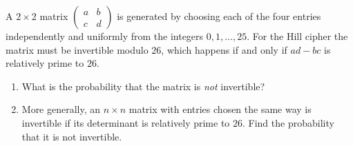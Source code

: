 A $2\times2$ matrix $\begin{pmatrix}a&b\\c&d\end{pmatrix}$ is generated by choosing each of the four entries independently and uniformly from the integers $0,1,\dots,25$. For the Hill cipher the matrix must be invertible modulo $26$, which happens if and only if $ad-bc$ is relatively prime to $26$.
\begin{enumerate}
\item[(a)] What is the probability that the matrix is \emph{not} invertible?
\item[(b)] More generally, an $n\times n$ matrix with entries chosen the same way is invertible if its determinant is relatively prime to $26$. Find the probability that it is not invertible.
\end{enumerate}

